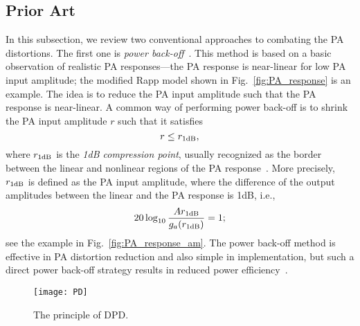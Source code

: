 \documentclass[10pt,twocolumn,twoside]{IEEEtran}
\begin{document}
\subsection{Prior Art}
\label{sec:prior_art}


In this subsection, we review two conventional approaches to combating the PA distortions.
The first one is {\it power back-off}~\cite{schenk2008rf,jedda2017precoding,spano2017symbol}.
This method is based on a basic observation of realistic PA responses---the PA response is near-linear for low PA input amplitude;
the modified Rapp model shown in Fig.~\ref{fig:PA_response} is an example.
The idea is to reduce the PA input amplitude such that the PA response is near-linear.
A common way of performing power back-off is to
shrink the PA input amplitude $r$ such that it satisfies
\begin{equation}\label{eq:1db}
	r \le r_{\rm 1dB},
\end{equation}
where $r_{\rm 1dB}$ is the {\it 1dB compression point}, usually recognized as the border between the linear and nonlinear regions of the PA response~\cite{ochiai2013analysis}.
More precisely, $r_{\rm 1dB}$ is defined as the PA input amplitude, where the difference of the output amplitudes between the linear and the PA response is 1dB, i.e.,
\[
20\log_{10}\frac{Ar_{\rm 1dB}}{g_a(r_{\rm 1dB})} = 1;
\]
see the example in Fig.~\ref{fig:PA_response_am}.
The power back-off method is effective in PA distortion reduction and also simple in implementation,
but such a direct power back-off strategy results in reduced power efficiency~\cite{ochiai2013analysis}.

\begin{figure}[t]
	\centering
	\texttt{[image: PD]}
	\caption{The principle of DPD.}
	\label{fig:PD}
\end{figure}
\end{document}
